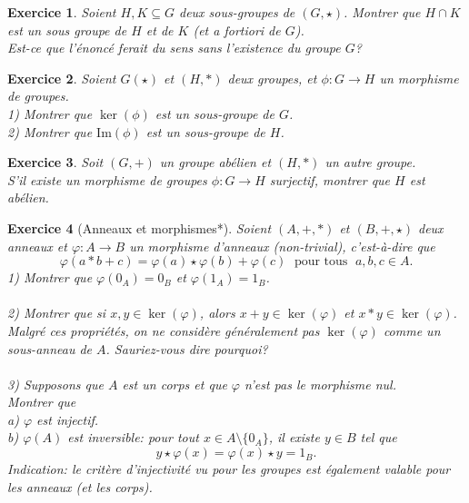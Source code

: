 \documentclass[11pt,french,table]{article}
\theoremstyle{exercice}
\newtheorem{exercice}{Exercice}
\begin{document}
\vspace{2em}    
\begin{exercice}
Soient $H,K \subseteq G$ deux sous-groupes de $(G,\star)$. Montrer que $H \cap K$ est un sous groupe de $H$ et de $K$ (et a fortiori de $G$). \\
Est-ce que l'énoncé ferait du sens sans l'existence du groupe $G$?
\end{exercice}
\vspace{2em}
\begin{exercice}
Soient $G(\star)$ et $(H,*)$ deux groupes, et $\phi : G \longrightarrow H$ un morphisme de groupes. \\
1) Montrer que $\ker(\phi)$ est un sous-groupe de $G$. \\
2) Montrer que $\text{Im}(\phi)$ est un sous-groupe de $H$.
\end{exercice}
\vspace{2em}
\begin{exercice}
Soit $(G,+)$ un groupe abélien et $(H,*)$ un autre groupe. \\
S'il existe un morphisme de groupes $\phi : G \longrightarrow H$ surjectif, montrer que $H$ est abélien.
\end{exercice}
\vspace{2em}
\begin{exercice}[Anneaux et morphismes*]
Soient $(A,+,*)$ et $(B,+,\star)$ deux anneaux et $\varphi : A \longrightarrow B$ un morphisme d'anneaux (non-trivial), c'est-à-dire que $$\varphi(a * b + c) = \varphi(a) \star \varphi(b) + \varphi(c) \; \text{ pour tous } \; a,b,c \in A.$$
1) Montrer que $\varphi(0_A) = 0_B$ et $\varphi(1_A) = 1_B$. \\
\\
2) Montrer que si $x,y \in \ker(\varphi)$, alors $x + y \in \ker(\varphi)$ et $x * y \in \ker(\varphi)$. \\
Malgré ces propriétés, on ne considère généralement pas $\ker(\varphi)$ comme un sous-anneau de $A$. Sauriez-vous dire pourquoi? \\
\\
3) Supposons que $A$ est un corps et que $\varphi$ n'est pas le morphisme nul. \\
Montrer que \\
\indent a) $\varphi$ est injectif. \\
\indent b) $\varphi(A)$ est inversible: pour tout $x \in A \setminus \{0_A\}$, il existe $y \in B$ tel que $$y \star \varphi(x) = \varphi(x) \star y = 1_B.$$
\textit{Indication: le critère d'injectivité vu pour les groupes est également valable pour les anneaux (et les corps).}
\end{exercice}
\end{document}
